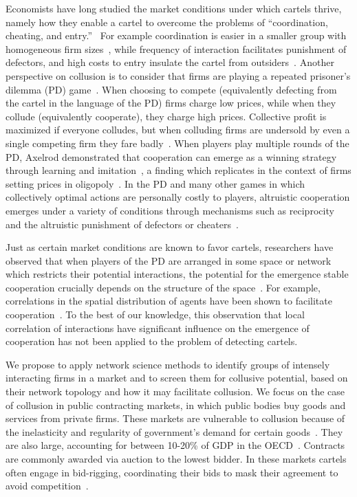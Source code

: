 Economists have long studied the market conditions under which cartels thrive, namely how they enable a cartel to overcome the problems of ``coordination, cheating, and entry.''~\cite{levenstein2006determines} For example coordination is easier in a smaller group with homogeneous firm sizes~\cite{compte2002capacity}, while frequency of interaction facilitates punishment of defectors, and high costs to entry insulate the cartel from outsiders~\cite{motta2004competition}. Another perspective on collusion is to consider that firms are playing a repeated prisoner's dilemma (PD) game~\cite{kofman1996aprisoner}. When choosing to compete (equivalently defecting from the cartel in the language of the PD) firms charge low prices, while when they collude (equivalently cooperate), they charge high prices. Collective profit is maximized if everyone colludes, but when colluding firms are undersold by even a single competing firm they fare badly~\cite{rapoport1974prisoner}. When players play multiple rounds of the PD, Axelrod demonstrated that cooperation can emerge as a winning strategy through learning and imitation~\cite{axelrod1981evolution}, a finding which replicates in the context of firms setting prices in oligopoly~\cite{dixon2002axelrod}. In the PD and many other games in which collectively optimal actions are personally costly to players, altruistic cooperation emerges under a variety of conditions through mechanisms such as reciprocity and the altruistic punishment of defectors or cheaters~\cite{bowles2011cooperative}.

Just as certain market conditions are known to favor cartels, researchers have observed that when players of the PD are arranged in some space or network which restricts their potential interactions, the potential for the emergence stable cooperation crucially depends on the structure of the space~\cite{nowak1993spatial,santos2008social,perc2013evolutionary,battiston2017determinants}. For example, correlations in the spatial distribution of agents have been shown to facilitate cooperation~\cite{szamado2008effect}. To the best of our knowledge, this observation that local correlation of interactions have significant influence on the emergence of cooperation has not been applied to the problem of detecting cartels.

We propose to apply network science methods to identify groups of intensely interacting firms in a market and to screen them for collusive potential, based on their network topology and how it may facilitate collusion. We focus on the case of collusion in public contracting markets, in which public bodies buy goods and services from private firms. These markets are vulnerable to collusion because of the inelasticity and regularity of government's demand for certain goods~\cite{pesendorfer2000,huschelrath2014cartel}. They are also large, accounting for between 10-20\% of GDP in the OECD~\cite{oecdprocurement}. Contracts are commonly awarded via auction to the lowest bidder. In these markets cartels often engage in bid-rigging, coordinating their bids to mask their agreement to avoid competition~\cite{porter1993detection}. 

